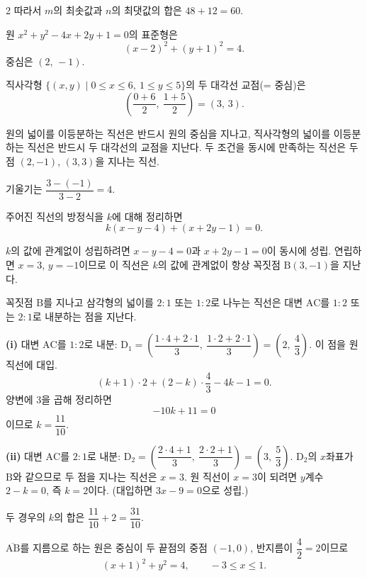 \documentclass[10pt,fleqn]{article}
\renewcommand{\solpart}[1]{%
  \par\addvspace{10pt}\noindent
  {\sffamily\bfseries\color{black}(#1)}\hspace{3mm}\ignorespaces%
}
\begin{document}
\begin{multicols}{2}
따라서 $m$의 최솟값과 $n$의 최댓값의 합은 $48 + 12 = 60$.


원 $x^{2} + y^{2} - 4x + 2y + 1 = 0$의 표준형은
\[ (x - 2)^{2} + (y + 1)^{2} = 4. \]
중심은 $(2,\,-1)$.

직사각형 $\{(x,y) \mid 0 \le x \le 6,\ 1 \le y \le 5\}$의 두 대각선 교점(= 중심)은
\[ \left( \dfrac{0+6}{2},\ \dfrac{1+5}{2} \right) = (3,\,3). \]

원의 넓이를 이등분하는 직선은 반드시 원의 중심을 지나고, 직사각형의 넓이를 이등분하는 직선은 반드시 두 대각선의 교점을 지난다. 두 조건을 동시에 만족하는 직선은 두 점 $(2, -1)$, $(3, 3)$을 지나는 직선.

기울기는 $\dfrac{3 - (-1)}{3 - 2} = 4$.


주어진 직선의 방정식을 $k$에 대해 정리하면
\[ k(x - y - 4) + (x + 2y - 1) = 0. \]

$k$의 값에 관계없이 성립하려면 $x - y - 4 = 0$과 $x + 2y - 1 = 0$이 동시에 성립. 연립하면 $x = 3$, $y = -1$이므로 이 직선은 $k$의 값에 관계없이 항상 꼭짓점 $\mathrm{B}(3, -1)$을 지난다.

꼭짓점 $\mathrm{B}$를 지나고 삼각형의 넓이를 $2:1$ 또는 $1:2$로 나누는 직선은 대변 $\mathrm{AC}$를 $1:2$ 또는 $2:1$로 내분하는 점을 지난다.

\solpart{i} 대변 $\mathrm{AC}$를 $1:2$로 내분: $\mathrm{D}_{1} = \left(\dfrac{1\cdot 4 + 2\cdot 1}{3},\ \dfrac{1\cdot 2 + 2\cdot 1}{3}\right) = \left(2,\ \dfrac{4}{3}\right)$. 이 점을 원 직선에 대입.
\[ (k+1)\cdot 2 + (2-k)\cdot \dfrac{4}{3} - 4k - 1 = 0. \]
양변에 $3$을 곱해 정리하면
\[ -10k + 11 = 0 \]
이므로 $k = \dfrac{11}{10}$.

\solpart{ii} 대변 $\mathrm{AC}$를 $2:1$로 내분: $\mathrm{D}_{2} = \left(\dfrac{2\cdot 4 + 1}{3},\ \dfrac{2\cdot 2 + 1}{3}\right) = \left(3,\ \dfrac{5}{3}\right)$. $\mathrm{D}_{2}$의 $x$좌표가 $\mathrm{B}$와 같으므로 두 점을 지나는 직선은 $x = 3$. 원 직선이 $x = 3$이 되려면 $y$계수 $2 - k = 0$, 즉 $k = 2$이다. (대입하면 $3x - 9 = 0$으로 성립.)

두 경우의 $k$의 합은 $\dfrac{11}{10} + 2 = \dfrac{31}{10}$.


$\overline{\mathrm{AB}}$를 지름으로 하는 원은 중심이 두 끝점의 중점 $(-1, 0)$, 반지름이 $\dfrac{4}{2} = 2$이므로
\[ (x+1)^{2} + y^{2} = 4,\qquad -3 \le x \le 1. \]


\end{multicols}
\end{document}
